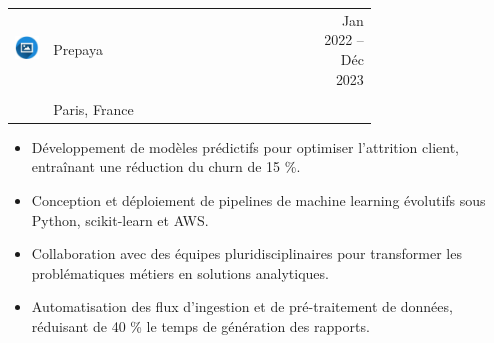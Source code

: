 \documentclass{article}
\begin{document}
\begin{paracol}{2}
\colorbox{maincolor}{%
  \begin{minipage}{\linewidth}
    \begin{tabular}{@{}lp{0.72\linewidth}r}
      \begin{minipage}{0.05\linewidth}
        \includegraphics[width=\linewidth]{picon.png}
      \end{minipage} & 
      Prepaya &  
      {\footnotesize Jan 2022 -- Déc 2023 } \\[-10pt]
      & {\color{sidetext}{Data Scientist}} & \\
      & {\small Paris, France } & \\
    \end{tabular}
\begin{itemize}
    \item Développement de modèles prédictifs pour optimiser l’attrition client, entraînant une réduction du churn de 15 \%.
    \item Conception et déploiement de pipelines de machine learning évolutifs sous Python, scikit-learn et AWS.
    \item Collaboration avec des équipes pluridisciplinaires pour transformer les problématiques métiers en solutions analytiques.
    \item Automatisation des flux d’ingestion et de pré-traitement de données, réduisant de 40 \% le temps de génération des rapports.
\end{itemize}
  \end{minipage}%
}


\end{paracol}
\end{document}
